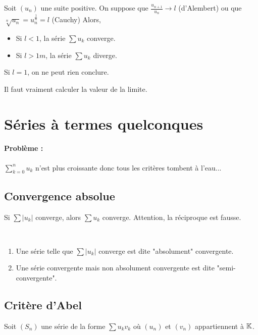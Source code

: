 \begin{prop}
Soit $(u_n)$ une suite positive.
On suppose que $\frac{u_{n+1}}{u_n}\to l$ (d'Alembert) ou que $\sqrt[n]{u_n}=u^{\frac{1}{n}}_n=l$ (Cauchy)
Alors,
\begin{itemize}
	\item Si $l<1$, la série $\sum u_k$ converge.
	\item Si $l>1m$, la série $\sum u_k$ diverge.
\end{itemize}
\end{prop}

\begin{rem}
Si $l=1$, on ne peut rien conclure.
\end{rem}
\begin{rem}
Il faut vraiment calculer la valeur de la limite.
\end{rem}
\section{Séries à termes quelconques}
\paragraph{Problème :} $\sum\limits_{k=0}^n u_k$ n'est plus croissante donc tous les critères tombent à l'eau...

\subsection{Convergence absolue}
\begin{thm}
Si $\sum|u_k|$ converge, alors $\sum u_k$ converge. Attention, la réciproque est fausse.
\end{thm}
\begin{defi}~
\begin{enumerate}
	\item Une série telle que $\sum |u_k|$ converge est dite "absolument" convergente.
	\item Une série convergente mais non absolument convergente est dite "semi-convergente". 
\end{enumerate}
\end{defi}

\subsection{Critère d'Abel}
Soit $(S_n)$ une série de la forme $\sum u_kv_k$ où $(u_n)$ et $(v_n)$ appartiennent à $\mathbb{K}$.

